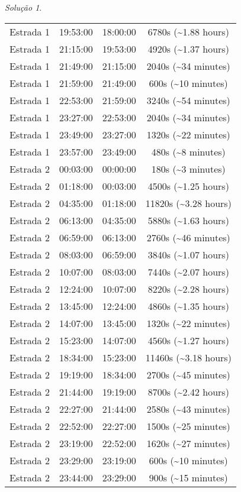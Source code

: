 \documentclass[
]{latex/krantz}
\theoremstyle{definition}
\theoremstyle{definition}
\theoremstyle{definition}
\theoremstyle{definition}
\theoremstyle{remark}
\newtheorem*{solution}{Solução}
\begin{document}
\begin{solution}
\begin{longtable}[]{@{}cccc@{}}
Estrada 1 & 19:53:00 & 18:00:00 & 6780s (\textasciitilde1.88 hours) \\
Estrada 1 & 21:15:00 & 19:53:00 & 4920s (\textasciitilde1.37 hours) \\
Estrada 1 & 21:49:00 & 21:15:00 & 2040s (\textasciitilde34 minutes) \\
Estrada 1 & 21:59:00 & 21:49:00 & 600s (\textasciitilde10 minutes) \\
Estrada 1 & 22:53:00 & 21:59:00 & 3240s (\textasciitilde54 minutes) \\
Estrada 1 & 23:27:00 & 22:53:00 & 2040s (\textasciitilde34 minutes) \\
Estrada 1 & 23:49:00 & 23:27:00 & 1320s (\textasciitilde22 minutes) \\
Estrada 1 & 23:57:00 & 23:49:00 & 480s (\textasciitilde8 minutes) \\
Estrada 2 & 00:03:00 & 00:00:00 & 180s (\textasciitilde3 minutes) \\
Estrada 2 & 01:18:00 & 00:03:00 & 4500s (\textasciitilde1.25 hours) \\
Estrada 2 & 04:35:00 & 01:18:00 & 11820s (\textasciitilde3.28 hours) \\
Estrada 2 & 06:13:00 & 04:35:00 & 5880s (\textasciitilde1.63 hours) \\
Estrada 2 & 06:59:00 & 06:13:00 & 2760s (\textasciitilde46 minutes) \\
Estrada 2 & 08:03:00 & 06:59:00 & 3840s (\textasciitilde1.07 hours) \\
Estrada 2 & 10:07:00 & 08:03:00 & 7440s (\textasciitilde2.07 hours) \\
Estrada 2 & 12:24:00 & 10:07:00 & 8220s (\textasciitilde2.28 hours) \\
Estrada 2 & 13:45:00 & 12:24:00 & 4860s (\textasciitilde1.35 hours) \\
Estrada 2 & 14:07:00 & 13:45:00 & 1320s (\textasciitilde22 minutes) \\
Estrada 2 & 15:23:00 & 14:07:00 & 4560s (\textasciitilde1.27 hours) \\
Estrada 2 & 18:34:00 & 15:23:00 & 11460s (\textasciitilde3.18 hours) \\
Estrada 2 & 19:19:00 & 18:34:00 & 2700s (\textasciitilde45 minutes) \\
Estrada 2 & 21:44:00 & 19:19:00 & 8700s (\textasciitilde2.42 hours) \\
Estrada 2 & 22:27:00 & 21:44:00 & 2580s (\textasciitilde43 minutes) \\
Estrada 2 & 22:52:00 & 22:27:00 & 1500s (\textasciitilde25 minutes) \\
Estrada 2 & 23:19:00 & 22:52:00 & 1620s (\textasciitilde27 minutes) \\
Estrada 2 & 23:29:00 & 23:19:00 & 600s (\textasciitilde10 minutes) \\
Estrada 2 & 23:44:00 & 23:29:00 & 900s (\textasciitilde15 minutes) \\
\end{longtable}


\end{solution}
\end{document}
